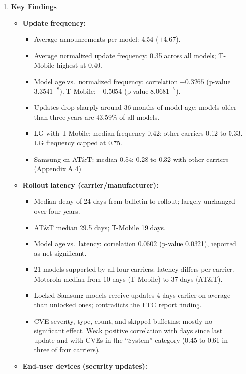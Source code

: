\documentclass[11pt,a4paper]{article}
\newcommand{\entrypart}[1]{\textbf{\color{accent}#1}\par\vspace{2pt}}
\begin{document}
\begin{enumerate}
    \item \entrypart{Key Findings}
    \begin{itemize}[leftmargin=*, itemsep=1pt, topsep=2pt]
        \item \textbf{Update frequency:}
        \begin{itemize}[itemsep=0pt]
            \item Average announcements per model: 4.54 ($\pm$4.67).
            \item Average normalized update frequency: 0.35 across all models; T-Mobile highest at 0.40.
            \item Model age vs.\ normalized frequency: correlation $-0.3265$ (p-value $3.3541^{-8}$). T-Mobile: $-0.5054$ (p-value $8.0681^{-7}$).
            \item Updates drop sharply around 36 months of model age; models older than three years are 43.59\% of all models.
            \item LG with T-Mobile: median frequency 0.42; other carriers 0.12 to 0.33. LG frequency capped at 0.75.
            \item Samsung on AT\&T: median 0.54; 0.28 to 0.32 with other carriers (Appendix A.4).
        \end{itemize}
        \item \textbf{Rollout latency (carrier/manufacturer):}
        \begin{itemize}[itemsep=0pt]
            \item Median delay of 24 days from bulletin to rollout; largely unchanged over four years.
            \item AT\&T median 29.5 days; T-Mobile 19 days.
            \item Model age vs.\ latency: correlation 0.0502 (p-value 0.0321), reported as not significant.
            \item 21 models supported by all four carriers: latency differs per carrier. Motorola median from 10 days (T-Mobile) to 37 days (AT\&T).
            \item Locked Samsung models receive updates 4 days earlier on average than unlocked ones; contradicts the FTC report finding.
            \item CVE severity, type, count, and skipped bulletins: mostly no significant effect. Weak positive correlation with days since last update and with CVEs in the ``System'' category (0.45 to 0.61 in three of four carriers).
        \end{itemize}
        \item \textbf{End-user devices (security updates):}

\end{itemize}
\end{enumerate}
\end{document}

